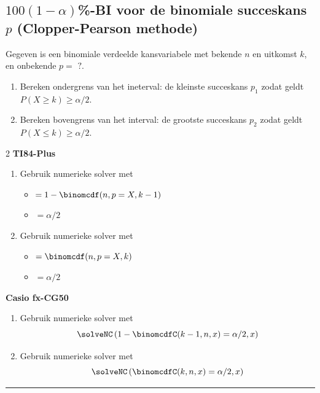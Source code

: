 \subsection*{$100(1-\alpha)$\si{\percent}-BI voor de binomiale succeskans $p$ (Clopper-Pearson methode)}
    Gegeven is een binomiale verdeelde kansvariabele met bekende $n$ en uitkomst $k$, en onbekende $p = \text{ ?}$.
    \begin{enumerate}
        \item Bereken ondergrens van het ineterval: de kleinste succeskans $p_1$ zodat geldt $P(X \geq k) \geq \alpha/2$.
        \item Bereken bovengrens van het interval: de grootste succeskans $p_2$ zodat geldt $P(X \leq k) \geq \alpha/2$.
    \end{enumerate}
    \begin{multicols}{2}
        \centering\textbf{TI84-Plus}
            \begin{enumerate}
                \item Gebruik numerieke solver met 
                \begin{itemize}
                    \item[$E_1$] $= 1 - \binomcdf(n, p=X, k-1)$
                    \item[$E_2$] $=\alpha/2$
                \end{itemize}
                \item Gebruik numerieke solver met
                \begin{itemize}
                    \item[$E_1$] $= \binomcdf(n, p=X, k)$
                    \item[$E_2$] $=\alpha/2$
                \end{itemize}
            \end{enumerate}

            \columnbreak

            \centering\textbf{Casio fx-CG50}
            \begin{enumerate}
                \item Gebruik numerieke solver met \[\solveNC\left(1-\binomcdfC(k-1,n,x)=\alpha/2, x\right)\]
                \item Gebruik numerieke solver met \[\solveNC\left(\binomcdfC(k,n,x)=\alpha/2, x\right)\]
            \end{enumerate}
    \end{multicols}
\hrule 

